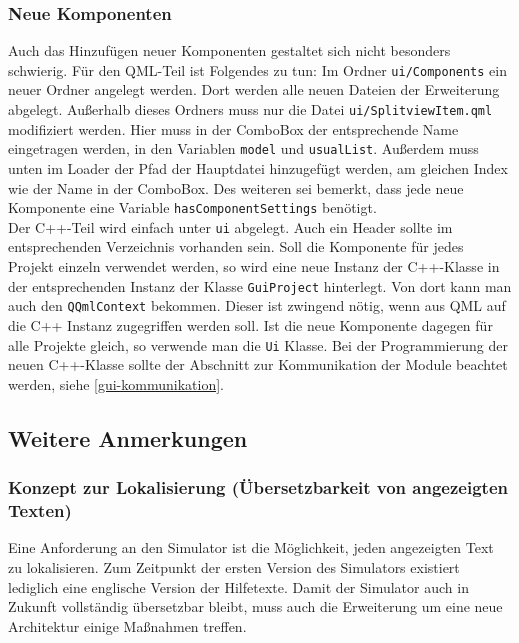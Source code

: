 \subsubsection{Neue Komponenten}
Auch das Hinzufügen neuer Komponenten gestaltet sich nicht besonders schwierig. Für den QML-Teil ist Folgendes zu tun: Im Ordner \texttt{ui/Components} ein neuer Ordner angelegt werden. Dort werden alle neuen Dateien der Erweiterung abgelegt. Außerhalb dieses Ordners muss nur die Datei \texttt{ui/SplitviewItem.qml} modifiziert werden. Hier muss in der ComboBox der entsprechende Name eingetragen werden, in den Variablen \texttt{model} und \texttt{usualList}. Außerdem muss unten im Loader der Pfad der Hauptdatei hinzugefügt werden, am gleichen Index wie der Name in der ComboBox. Des weiteren sei bemerkt, dass jede neue Komponente eine Variable \texttt{hasComponentSettings} benötigt.\\
 Der C++-Teil wird einfach unter \texttt{ui} abgelegt. Auch ein Header sollte im entsprechenden Verzeichnis vorhanden sein. Soll die Komponente für jedes Projekt einzeln verwendet werden, so wird eine neue Instanz der C++-Klasse in der entsprechenden Instanz der Klasse \texttt{GuiProject} hinterlegt. Von dort kann man auch den \texttt{QQmlContext} bekommen. Dieser ist zwingend nötig, wenn aus QML auf die C++ Instanz zugegriffen werden soll. Ist die neue Komponente dagegen für alle Projekte gleich, so verwende man die \texttt{Ui} Klasse. Bei der Programmierung der neuen C++-Klasse sollte der Abschnitt zur Kommunikation der Module beachtet werden, siehe \autoref{gui-kommunikation}.
 
 \subsection{Weitere Anmerkungen}
 
 \subsubsection{Konzept zur Lokalisierung (Übersetzbarkeit von angezeigten Texten)}
 
 Eine Anforderung an den Simulator ist die Möglichkeit, jeden angezeigten Text zu lokalisieren. Zum Zeitpunkt der ersten Version des Simulators existiert lediglich eine englische Version der Hilfetexte. Damit der Simulator auch in Zukunft vollständig übersetzbar bleibt, muss auch die Erweiterung um eine neue Architektur einige Maßnahmen treffen.\\
 
